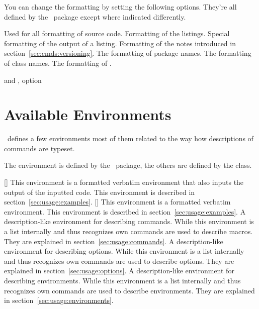 \documentclass[load-preamble]{cnltx-doc}
\begin{document}
You can change the formatting by setting the following options.  They're all
defined by the \cnltx\ package except where indicated differently.

\begin{options}
    Used for all formatting of source code.
    Formatting of the listings.
  \Default
    Special formatting of the output of a listing.
    \byclass Formatting of the notes introduced in
    section~\ref{sec:cmds:versioning}.
    The formatting of package names.
    The formatting of class names.
    The formatting of .
\end{options}

\begin{example}
   and , option 
\end{example}

\section{Available Environments}\label{sec:envs}

\cnltx\ defines a few environments most of them related to the way how
descriptions of commands are typeset.

The  environment is defined by the \cnltx\ package, the
others are defined by the class.

\begin{environments}
  []
    This environment is a formatted verbatim environment that also inputs the
    output of the inputted code.  This environment is described in
    section~\ref{sec:usage:examples}.
  []
    This environment is a formatted verbatim environment.  This environment is
    described in section~\ref{sec:usage:examples}.
    A description-like environment for describing commands.  While this
    environment is a list internally and thus recognizes  own
    commands are used to describe macros.  They are explained in
    section~\ref{sec:usage:commands}.
    A description-like environment for describing options.  While this
    environment is a list internally and thus recognizes  own
    commands are used to describe options.  They are explained in
    section~\ref{sec:usage:options}.
    A description-like environment for describing environments.  While this
    environment is a list internally and thus recognizes  own
    commands are used to describe environments.  They are explained in
    section~\ref{sec:usage:environments}.
\end{environments}
\end{document}
